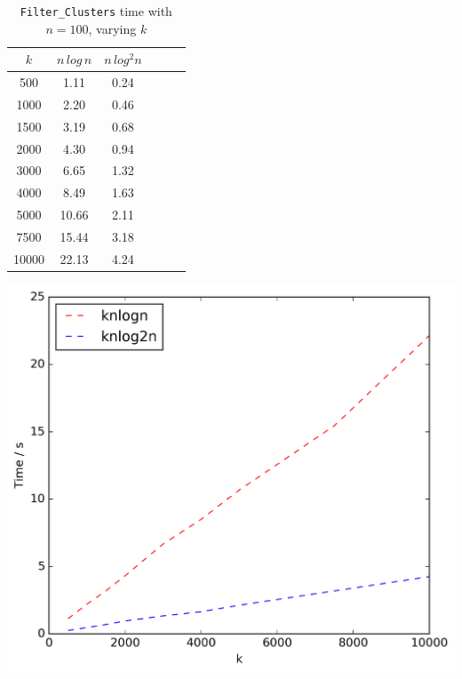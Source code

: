 \documentclass{article}
\begin{document}
\begin{table}[!ht]
\begin{minipage}{0.48\textwidth}
            \vspace{0.5cm}
        \end{minipage}\hfill
        \begin{minipage}{0.48\textwidth}
            \centering
            \caption{\texttt{Filter\_Clusters} time with $n = 100$, varying $k$}
            \label{tab:filterk}
            \begin{tabular}{c||ccccc}
                $k$ & $n\,log\,n$ & $n\,log^2n$\\
                \hline\hline
                500 & 1.11 & 0.24\\
                1000 & 2.20 & 0.46\\
                1500 & 3.19 & 0.68\\
                2000 & 4.30 & 0.94\\
                3000 & 6.65 & 1.32\\
                4000 & 8.49 & 1.63\\
                5000 & 10.66 & 2.11\\
                7500 & 15.44 & 3.18\\
                10000 & 22.13 & 4.24\\
            \end{tabular}
            \includegraphics[scale=0.4]{varyingk1_filter}
            \vspace{0.5cm}
        \end{minipage}
        \begin{minipage}{0.48\textwidth}

\end{minipage}
\end{table}
\end{document}
